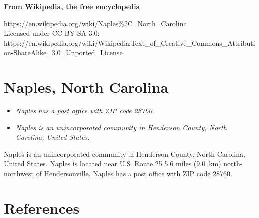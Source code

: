 \textbf{From Wikipedia, the free encyclopedia}

https://en.wikipedia.org/wiki/Naples\%2C\_North\_Carolina\\
Licensed under CC BY-SA 3.0:\\
https://en.wikipedia.org/wiki/Wikipedia:Text\_of\_Creative\_Commons\_Attribution-ShareAlike\_3.0\_Unported\_License

\section{Naples, North Carolina}\label{naples-north-carolina}

\begin{itemize}
\item
  \emph{Naples has a post office with ZIP code 28760.}
\item
  \emph{Naples is an unincorporated community in Henderson County, North
  Carolina, United States.}
\end{itemize}

Naples is an unincorporated community in Henderson County, North
Carolina, United States. Naples is located near U.S. Route 25 5.6 miles
(9.0~km) north-northwest of Hendersonville. Naples has a post office
with ZIP code 28760.

\section{References}\label{references}

